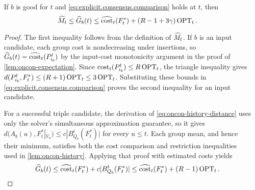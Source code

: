 \begin{lemma}\label{lem:explicit.estimated.history}
If $ b $ is good for $ t $ and \eqref{eq:explicit.consensus.comparison} holds at $ t $, then
\begin{align}
    \widehat M_{t}\le\widehat G_{b}(t)
    \le\widehat{\operatorname{cost}}_{t}(F_t^*)+(R-1+3\gamma)\operatorname{OPT}_t.
    \label{eq:explicit.consensus.good.history}
\end{align}
\end{lemma}
\begin{proof}
The first inequality follows from the definition of $ \widehat M_{t} $.
If $ b $ is an input candidate, each group cost is nondecreasing under insertions, so $ \widehat G_{b}(t)=\widehat{\operatorname{cost}}_{t}(P_{i_b}^t) $ by the input-cost monotonicity argument in the proof of \cref{lem:oncon-expectation}.
Since $ \operatorname{cost}_t(P_{i_b}^t)\le R\operatorname{OPT}_t $, the triangle inequality gives $ d(P_{i_b}^t,F_t^*)\le(R+1)\operatorname{OPT}_t\le3\operatorname{OPT}_t $.
Substituting these bounds in \eqref{eq:explicit.consensus.comparison} proves the second inequality for an input candidate.

For a successful triple candidate, the derivation of \eqref{eq:oncon-history-distance} uses only the solver's simultaneous approximation guarantee, so it gives $ d(A_b(u),F_t^*|_{V_u})\le c|B_{Q_b}^t(F_t^*)| $ for every $ u\le t $.
Each group mean, and hence their minimum, satisfies both the cost comparison and restriction inequalities used in \cref{lem:oncon-history}.
Applying that proof with estimated costs yields
\begin{align}
    \widehat G_{b}(t)
    \le\widehat{\operatorname{cost}}_{t}(F_t^*)+c|B_{Q_b}^t(F_t^*)|
    \le\widehat{\operatorname{cost}}_{t}(F_t^*)+(R-1)\operatorname{OPT}_t.
    \nonumber
\end{align}
\end{proof}

